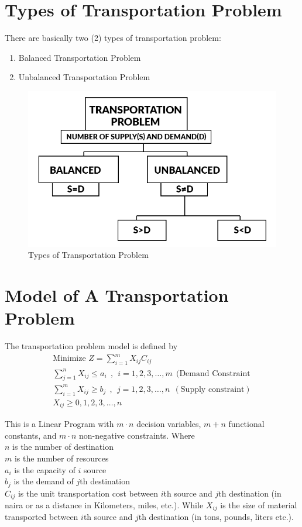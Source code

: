 \documentclass[12pt]{report}
\newcommand{\sps}{\\[0.2cm]}
\newcommand{\NI}{\noindent}
\newcommand{\tp}{Transportation Problem }
\newcommand{\stp}{transportation problem }
\begin{document}
		\section{Types of Transportation Problem}
	There are basically two (2) types of transportation problem:
	\begin{enumerate}
		\item Balanced \tp\\[-1.1cm]
		\item Unbalanced \tp \\[-1.3cm]
	\end{enumerate}
	\begin{figure}[!h]
		\centering
		\includegraphics[width=0.51\linewidth]{tt4}
		\caption{Types of Transportation Problem}
		\label{fig:1_1}
	\end{figure}
	
		\section{Model of A \tp}
	The \stp model is defined by
	\begin{gather}
		\text{Minimize } Z = \sum_{i=1}^{m}X_{ij}C_{ij}\label{eq:3_1}\sps
		\sum_{j=1}^{n}X_{ij} \leq a_i~~,~~ i=1,2,3,\ldots,m~~ (\text{Demand Constraint}\label{eq:3_2}\sps
		\sum_{i=1}^{m}X_{ij} \geq b_j~~,~~ j=1,2,3,\ldots,n~~ (\text{Supply constraint})\label{eq:3_3}\sps
		X_{ij} \geq 0,1,2,3,\ldots,n\label{eq:3_4}
	\end{gather}
	
	\NI This is a Linear Program with $m\cdot n$ decision variables, $m+n$ functional constants, and $m\cdot n$ non-negative constraints. Where\sps
	$n$ is the number of destination\\
	$m$ is the number of resources\\
	$a_i$ is the capacity of $i$ source\\
	$b_j$ is the demand of $j$th destination\\
	$C_{ij}$ is the unit transportation cost between $i$th source and $j$th destination (in naira or as a distance in Kilometers, miles, etc.). While $X_{ij}$ is the size of material transported between $i$th source and $j$th destination (in tons, pounds, liters etc.).\sps
	
\end{document}
